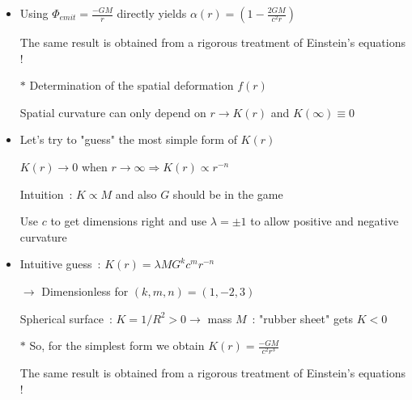 \Tr
\begin{itemize}
\item Using $\displaystyle \Phi_{emit}=\frac{-GM}{r}$ directly yields
      {\blue $\displaystyle \alpha(r)=\left(1-\frac{2GM}{c^{2}r}\right)$}
\item[] The same result is obtained from a rigorous treatment of Einstein's equations !
\item[$\ast$] {\red Determination of the spatial deformation $f(r)$}
\item[] Spatial curvature can only depend on $r \rightarrow K(r)$ and $K(\infty) \equiv 0$
\item Let's try to "guess" the most simple form of $K(r)$
\item[] $K(r) \rightarrow 0$ when $r \rightarrow \infty \Rightarrow K(r) \propto r^{-n}$
\item[] Intuition~: $K \propto M$ and also $G$ should be in the game
\item[] Use $c$ to get dimensions right and use $\lambda=\pm 1$ to allow positive and
        negative curvature 
\item Intuitive guess~: $K(r)=\lambda MG^{k}c^{m}r^{-n}$
\item[] $\rightarrow$ Dimensionless for $(k,m,n)=(1,-2,3)$
\item[] Spherical surface~: $K=1/R^{2} >0 \rightarrow$ mass $M$~: "rubber sheet" gets $K<0$
\item[$\ast$] So, for the simplest form we obtain {\blue $\displaystyle K(r)=\frac{-GM}{c^{2}r^{3}}$}
\item[] The same result is obtained from a rigorous treatment of Einstein's equations !
\end{itemize}


